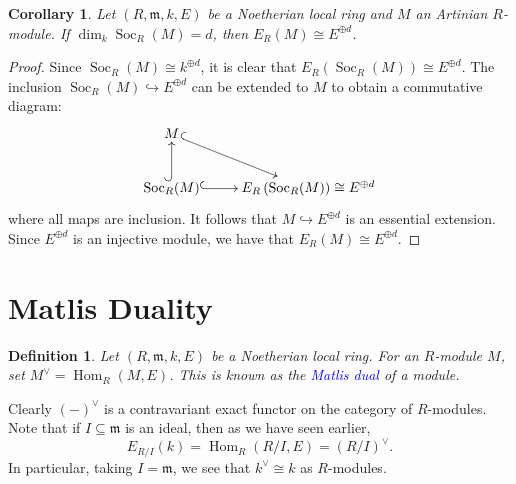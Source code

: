 \documentclass[10pt]{article}
\theoremstyle{thmstyle}
\theoremstyle{defstyle}
\newtheorem{definition}[theorem]{Definition}
\newtheorem{corollary}[theorem]{Corollary}
\newcommand{\Hom}{\operatorname{Hom}}
\newcommand{\frakm}{\mathfrak{m}} %
\newcommand{\into}{\hookrightarrow}
\newcommand{\define}[1]{\textcolor{blue}{\textit{#1}}}
\newcommand{\Soc}{\operatorname{Soc}}
\begin{document}
\begin{corollary}
    Let $(R,\frakm, k, E)$ be a Noetherian local ring and $M$ an Artinian $R$-module. If $\dim_k\Soc_R(M) = d$, then $E_R(M)\cong E^{\oplus d}$.
\end{corollary}
\begin{proof}
    Since $\Soc_R(M)\cong k^{\oplus d}$, it is clear that $E_R\left(\Soc_R(M)\right)\cong E^{\oplus d}$. The inclusion $\Soc_R(M)\into E^{\oplus d}$ can be extended to $M$ to obtain a commutative diagram:
    \begin{equation*}
        \xymatrix {
            M\ar@{^{(}->}[rd]\\
            \Soc_R(M)\ar@{^{(}->}[r]\ar@{^{(}->}[u] & E_R\left(\Soc_R(M)\right)\cong E^{\oplus d}
        }
    \end{equation*}
    where all maps are inclusion. It follows that $M\into E^{\oplus d}$ is an essential extension. Since $E^{\oplus d}$ is an injective module, we have that $E_R(M)\cong E^{\oplus d}$.
\end{proof}



\section{Matlis Duality}

\begin{definition}
    Let $(R,\frakm, k, E)$ be a Noetherian local ring. For an $R$-module $M$, set $M^\vee = \Hom_R(M, E)$. This is known as the \define{Matlis dual} of a module.
\end{definition}

Clearly $(-)^\vee$ is a contravariant exact functor on the category of $R$-modules. Note that if $I\subseteq\frakm$ is an ideal, then as we have seen earlier, 
\begin{equation*}
    E_{R/I}(k) = \Hom_R\left(R/I, E\right) = \left(R/I\right)^\vee.
\end{equation*}
In particular, taking $I = \frakm$, we see that $k^\vee \cong k$ as $R$-modules.
\end{document}
